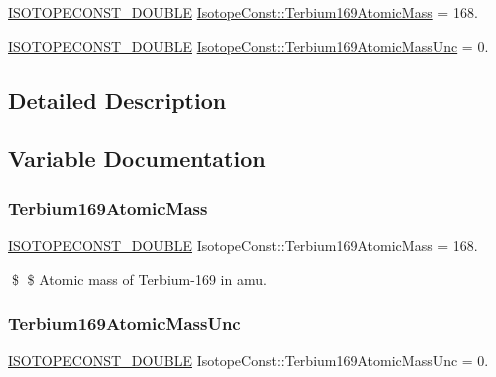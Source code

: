 \begin{DoxyCompactItemize}
\item 
\mbox{\hyperlink{group___isotope_const-_macros_ga8f45a7272ce02c0b4c65c44636ed719a}{I\+S\+O\+T\+O\+P\+E\+C\+O\+N\+S\+T\+\_\+\+D\+O\+U\+B\+LE}} \mbox{\hyperlink{group___isotope_const-_terbium-_tb169_ga0518b20b75b0fd6177e73147fe1776fe}{Isotope\+Const\+::\+Terbium169\+Atomic\+Mass}} = 168.
\item 
\mbox{\hyperlink{group___isotope_const-_macros_ga8f45a7272ce02c0b4c65c44636ed719a}{I\+S\+O\+T\+O\+P\+E\+C\+O\+N\+S\+T\+\_\+\+D\+O\+U\+B\+LE}} \mbox{\hyperlink{group___isotope_const-_terbium-_tb169_ga9a8b1e83311a3cab323acd4341cfec73}{Isotope\+Const\+::\+Terbium169\+Atomic\+Mass\+Unc}} = 0.
\end{DoxyCompactItemize}


\subsection{Detailed Description}


\subsection{Variable Documentation}
\mbox{\label{group___isotope_const-_terbium-_tb169_ga0518b20b75b0fd6177e73147fe1776fe}} 
\subsubsection{\texorpdfstring{Terbium169\+Atomic\+Mass}{Terbium169AtomicMass}}
{\footnotesize\ttfamily \mbox{\hyperlink{group___isotope_const-_macros_ga8f45a7272ce02c0b4c65c44636ed719a}{I\+S\+O\+T\+O\+P\+E\+C\+O\+N\+S\+T\+\_\+\+D\+O\+U\+B\+LE}} Isotope\+Const\+::\+Terbium169\+Atomic\+Mass = 168.}

\$ \$ Atomic mass of Terbium-\/169 in amu. \mbox{\label{group___isotope_const-_terbium-_tb169_ga9a8b1e83311a3cab323acd4341cfec73}} 
\subsubsection{\texorpdfstring{Terbium169\+Atomic\+Mass\+Unc}{Terbium169AtomicMassUnc}}
{\footnotesize\ttfamily \mbox{\hyperlink{group___isotope_const-_macros_ga8f45a7272ce02c0b4c65c44636ed719a}{I\+S\+O\+T\+O\+P\+E\+C\+O\+N\+S\+T\+\_\+\+D\+O\+U\+B\+LE}} Isotope\+Const\+::\+Terbium169\+Atomic\+Mass\+Unc = 0.}

